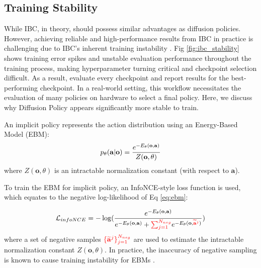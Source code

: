 \subsection{Training Stability}
\label{sec:ibc_stability}


While IBC, in theory, should possess similar advantages as diffusion policies. However, achieving reliable and high-performance results from IBC in practice is challenging due to IBC's inherent training instability \cite{ta2022conditional}. Fig \ref{fig:ibc_stability} shows training error spikes and unstable evaluation performance throughout the training process, making hyperparameter turning critical and checkpoint selection difficult. As a result, \citet{ibc} evaluate every checkpoint and report results for the best-performing checkpoint. In a real-world setting, this workflow necessitates the evaluation of many policies on hardware to select a final policy. Here, we discuss why Diffusion Policy appears significantly more stable to train.


An implicit policy represents the action distribution using an Energy-Based Model (EBM):
\vspace{-2mm}
\begin{equation}
    \label{eq:ebm}
    p_\theta(\mathbf{a}|\mathbf{o})=\frac{e^{-E_\theta(\mathbf{o},\mathbf{a})}}{Z(\mathbf{o},\theta)}
\vspace{-1mm}
\end{equation}
where $Z(\mathbf{o},\theta)$ is an intractable normalization constant (with respect to $\mathbf{a}$). 

To train the EBM for implicit policy, an InfoNCE-style loss function is used, which equates to the negative log-likelihood of Eq \ref{eq:ebm}:

\begin{equation}
    \label{eq:infonce}
    \mathcal{L}_{infoNCE}=-\log(\frac{
        e^{-E_\theta(\mathbf{o},\mathbf{a})}
    }{
        e^{-E_\theta(\mathbf{o},\mathbf{a})} + 
            \textcolor{red}{\sum^{N_{neg}}_{j=1}}e^{
                -E_\theta(\mathbf{o},\textcolor{red}{\widetilde{\mathbf{a}}^j})}
    })
\end{equation}
where a set of negative samples $\textcolor{red}{\{\widetilde{\mathbf{a}}^j\}^{N_{neg}}_{j=1}}$ are used to estimate the intractable normalization constant $Z(\mathbf{o},\theta)$. In practice, the inaccuracy of negative sampling is known to cause training instability for EBMs \cite{du2020improved,ta2022conditional}.

